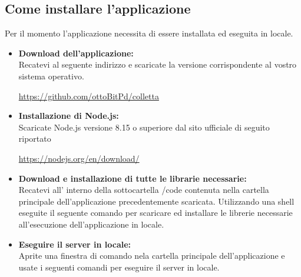 \subsection{Come installare l'applicazione}
Per il momento l'applicazione necessita di essere installata ed eseguita in locale.
\begin{itemize}
	\item \textbf{Download dell'applicazione:}\\
Recatevi al seguente indirizzo e scaricate la versione corrispondente al vostro sistema operativo.
\begin{center}
	\url{https://github.com/ottoBitPd/colletta} 	
\end{center}


	\item \textbf{Installazione di Node.js:}\\
Scaricate Node.js versione 8.15 o superiore dal sito ufficiale di seguito riportato 
\begin{center}
	\url{https://nodejs.org/en/download/}
\end{center}

	\item \textbf{Download e installazione di tutte le librarie necessarie:}\\ 
Recatevi all' interno della sottocartella /code contenuta nella cartella principale dell'applicazione precedentemente scaricata. Utilizzando una shell eseguite il seguente comando per scaricare ed installare le librerie necessarie all'esecuzione dell'applicazione in locale.

\begin{center}
	\noindent{}
\end{center}

	\item \textbf{Eseguire il server in locale:}\\
Aprite una finestra di comando nela cartella principale dell'applicazione e usate i seguenti comandi per eseguire il server in locale.

\begin{center}
	\noindent{}
\end{center}

\end{itemize}
